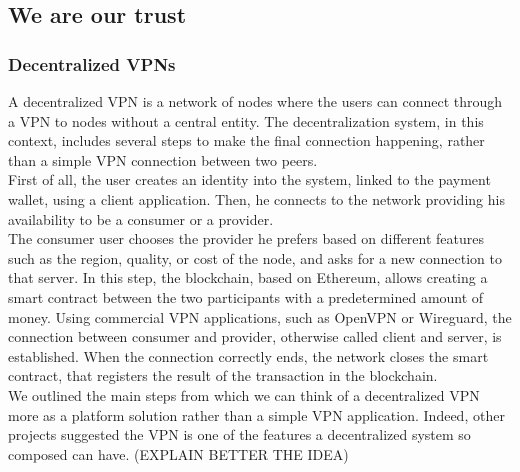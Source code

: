 \documentclass[]{article}
\begin{document}
	\subsection{We are our trust}

	\subsubsection{Decentralized VPNs}

	A decentralized VPN is a network of nodes where the users can connect through a VPN to nodes without a central entity. The decentralization system, in this context, includes several steps to make the final connection happening, rather than a simple VPN connection between two peers.\\
	First of all, the user creates an identity into the system, linked to the payment wallet, using a client application. Then, he connects to the network providing his availability to be a consumer or a provider.\\
	The consumer user chooses the provider he prefers based on different features such as the region, quality, or cost of the node, and asks for a new connection to that server. In this step, the blockchain, based on Ethereum, allows creating a smart contract between the two participants with a predetermined amount of money. Using commercial VPN applications, such as OpenVPN or Wireguard, the connection between consumer and provider, otherwise called client and server, is established. When the connection correctly ends, the network closes the smart contract, that registers the result of the transaction in the blockchain.\\
	We outlined the main steps from which we can think of a decentralized VPN more as a platform solution rather than a simple VPN application. Indeed, other projects suggested the VPN is one of the features a decentralized system so composed can have. (EXPLAIN BETTER THE IDEA)  
		          
\end{document}
